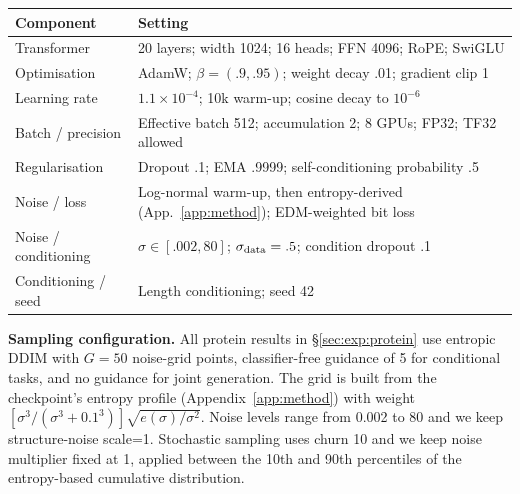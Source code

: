 \par\addvspace{6pt}\noindent
    \begin{minipage}{\linewidth}
        \makeatletter{}\makeatother
        \centering\small
        \caption{Training configuration of the reported protein run.}
        \label{tab:protein:training}
        \setlength{\tabcolsep}{4pt}
        \begin{tabular}{@{}ll@{}}
        \toprule
        Component & Setting \\
        \midrule
        Transformer & 20 layers; width 1024; 16 heads; FFN 4096; RoPE; SwiGLU \\
        Optimisation & AdamW; $\beta=(.9,.95)$; weight decay .01; gradient clip 1 \\
        Learning rate & $1.1\!\times\!10^{-4}$; 10k warm-up; cosine decay to $10^{-6}$ \\
        Batch / precision & Effective batch 512; accumulation 2; 8 GPUs; FP32; TF32 allowed \\
        Regularisation & Dropout .1; EMA .9999; self-conditioning probability .5 \\
        Noise / loss & Log-normal warm-up, then entropy-derived (App.~\ref{app:method}); EDM-weighted bit loss \\
        Noise / conditioning & $\sigma\in[.002,80]$; $\sigma_{\rm data}=.5$; condition dropout .1 \\
        Conditioning / seed & Length conditioning; seed 42 \\
        \bottomrule
    \end{tabular}
\end{minipage}\par\addvspace{6pt}

\textbf{Sampling configuration.} All protein results in \S\ref{sec:exp:protein} use entropic DDIM with $G=50$ noise-grid points, classifier-free guidance of 5 for conditional tasks, and no guidance for joint generation. The grid is built from the checkpoint's entropy profile (Appendix~\ref{app:method}) with weight $[\sigma^3/(\sigma^3+0.1^3)]\sqrt{e(\sigma)/\sigma^2}$. Noise levels range from 0.002 to 80 and we keep structure-noise scale=1. Stochastic sampling uses churn 10 and we keep noise multiplier fixed at 1, applied between the 10th and 90th percentiles of the entropy-based cumulative distribution.


